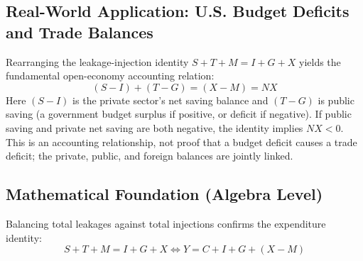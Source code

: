 \documentclass[11pt,letterpaper]{article}
\begin{document}
\subsection*{Real-World Application: U.S. Budget Deficits and Trade Balances}
Rearranging the leakage-injection identity $S + T + M = I + G + X$ yields the fundamental open-economy accounting relation:
\[
(S - I) + (T - G) = (X - M) = NX
\]
Here $(S-I)$ is the private sector's net saving balance and $(T-G)$ is public saving (a government budget surplus if positive, or deficit if negative). If public saving and private net saving are both negative, the identity implies $NX<0$. This is an accounting relationship, not proof that a budget deficit causes a trade deficit; the private, public, and foreign balances are jointly linked.

\subsection*{Mathematical Foundation (Algebra Level)}
Balancing total leakages against total injections confirms the expenditure identity:
\begin{equation}
S + T + M = I + G + X \iff Y = C + I + G + (X - M)
\end{equation}
\end{document}
